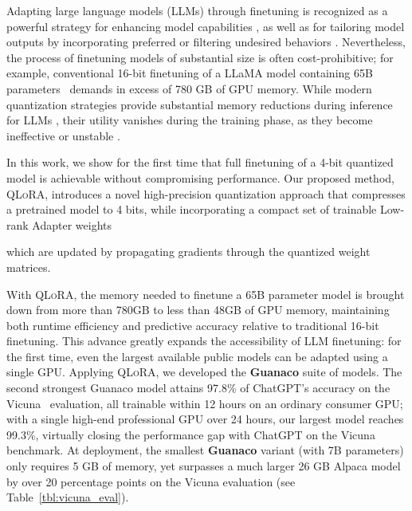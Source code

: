 Adapting large language models (LLMs) through finetuning is recognized as a powerful strategy for enhancing model capabilities \citep{min2021metaicl, wei2021finetuned, ouyang2022training, wang2022super, wang2022self, liu2022few}, as well as for tailoring model outputs by incorporating preferred or filtering undesired behaviors \citep{ouyang2022training,askell2021general,bai2022training}. Nevertheless, the process of finetuning models of substantial size is often cost-prohibitive; for example, conventional 16-bit finetuning of a LLaMA model containing 65B parameters~\citep{touvron2023llama} demands in excess of 780 GB of GPU memory. While modern quantization strategies provide substantial memory reductions during inference for LLMs \citep{dettmers2022llm, dettmers2022case, frantar2022gptq, xiao2022smoothquant}, their utility vanishes during the training phase, as they become ineffective or unstable \citep{wortsman2023stable}.

In this work, we show for the first time that full finetuning of a 4-bit quantized model is achievable without compromising performance. Our proposed method, \textsc{QLoRA}, introduces a novel high-precision quantization approach that compresses a pretrained model to 4 bits, while incorporating a compact set of trainable Low-rank Adapter weights \citep{hu2021lora}

which are updated by propagating gradients through the quantized weight matrices.

With \textsc{QLoRA}, the memory needed to finetune a 65B parameter model is brought down from more than 780GB to less than 48GB of GPU memory, maintaining both runtime efficiency and predictive accuracy relative to traditional 16-bit finetuning. This advance greatly expands the accessibility of LLM finetuning: for the first time, even the largest available public models can be adapted using a single GPU. Applying \textsc{QLoRA}, we developed the \textbf{Guanaco} suite of models. The second strongest Guanaco model attains 97.8\% of ChatGPT’s accuracy on the Vicuna~\citep{vicuna2023} evaluation, all trainable within 12 hours on an ordinary consumer GPU; with a single high-end professional GPU over 24 hours, our largest model reaches 99.3\%, virtually closing the performance gap with ChatGPT on the Vicuna benchmark. At deployment, the smallest \textbf{Guanaco} variant (with 7B parameters) only requires 5 GB of memory, yet surpasses a much larger 26 GB Alpaca model by over 20 percentage points on the Vicuna evaluation (see Table~\ref{tbl:vicuna_eval}).


